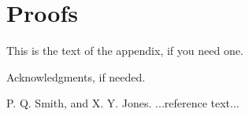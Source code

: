 \documentclass[preprint]{sigplanconf}
\begin{document}
\appendix
\section{Proofs}

This is the text of the appendix, if you need one.

\acks

Acknowledgments, if needed.







\begin{thebibliography}{}
\softraggedright

P. Q. Smith, and X. Y. Jones. ...reference text...

\end{thebibliography}
\end{document}
